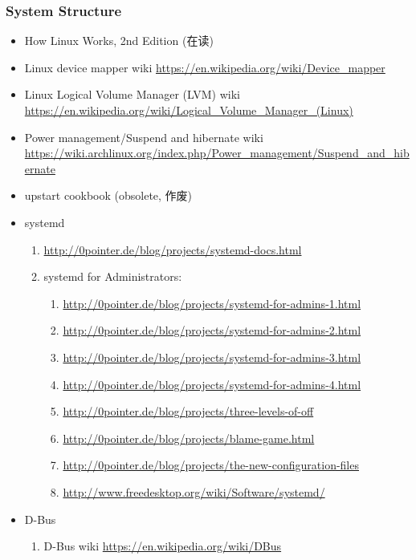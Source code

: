 \documentclass{article}
\begin{document}
\subsubsection{System Structure}
\begin{itemize}
    \item How Linux Works, 2nd Edition (在读)
    \item Linux device mapper wiki \url{https://en.wikipedia.org/wiki/Device_mapper}
    \item Linux Logical Volume Manager (LVM) wiki \url{https://en.wikipedia.org/wiki/Logical_Volume_Manager_(Linux)}
    \item Power management/Suspend and hibernate wiki \url{https://wiki.archlinux.org/index.php/Power_management/Suspend_and_hibernate}
    \item upstart cookbook (obsolete, 作废)
    \item systemd
        \begin{enumerate}
            \item \url{http://0pointer.de/blog/projects/systemd-docs.html}
            \item systemd for Administrators:
                \begin{enumerate}
                    \item \url{http://0pointer.de/blog/projects/systemd-for-admins-1.html}
                    \item \url{http://0pointer.de/blog/projects/systemd-for-admins-2.html}
                    \item \url{http://0pointer.de/blog/projects/systemd-for-admins-3.html}
                    \item \url{http://0pointer.de/blog/projects/systemd-for-admins-4.html}
                    \item \url{http://0pointer.de/blog/projects/three-levels-of-off}
                    \item \url{http://0pointer.de/blog/projects/blame-game.html}
                    \item \url{http://0pointer.de/blog/projects/the-new-configuration-files}
                    \item \url{http://www.freedesktop.org/wiki/Software/systemd/}
                \end{enumerate}
        \end{enumerate}
    \item D-Bus
        \begin{enumerate}
            \item D-Bus wiki \url{https://en.wikipedia.org/wiki/DBus}

\end{enumerate}
\end{itemize}
\end{document}
